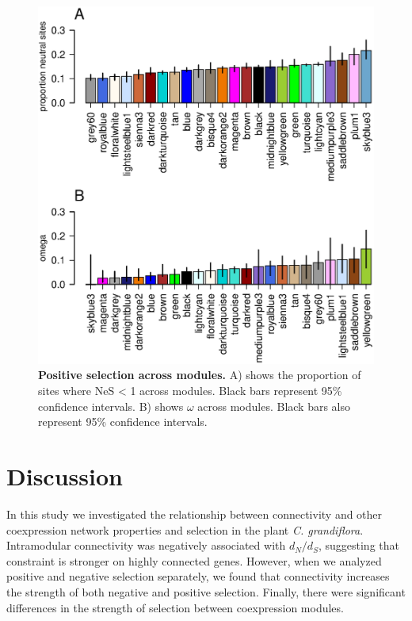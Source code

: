 \begin{figure}[ht!]
\centering
\includegraphics[width=\linewidth]{Ch4Fig4}
\caption{\textbf{Positive selection across modules.} A) shows the proportion of sites where NeS < 1 across modules. Black bars represent 95\% confidence intervals. B) shows $\omega$ across modules. Black bars also represent 95\% confidence intervals.
}
\label{fig:f4}
\end{figure}


\section{Discussion}

In this study we investigated the relationship between connectivity and other coexpression network properties and selection in the plant \textit{C. grandiflora}. Intramodular connectivity was negatively associated with $d_{N}/d_{S}$, suggesting that constraint is stronger on highly connected genes. However, when we analyzed positive and negative selection separately, we found that connectivity increases the strength of both negative and positive selection. Finally, there were significant differences in the strength of selection between coexpression modules.


